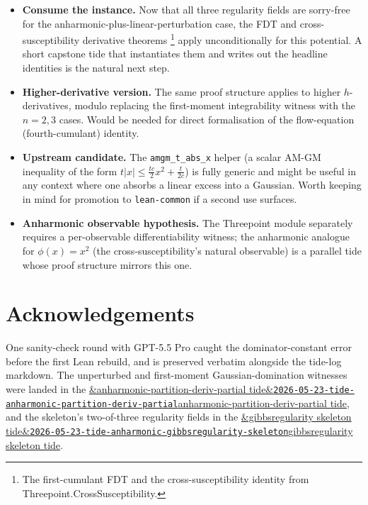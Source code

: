 \documentclass[11pt]{article}
\newcommand{\tideref}[2][]{\href{https://therisensea.org/tides/#2/}{\ifx&#1&\texttt{#2}\else#1\fi}}
\begin{document}
\begin{itemize}[itemsep=2pt]
  \item \textbf{Consume the instance.} Now that all three
    regularity fields are sorry-free for the
    anharmonic-plus-linear-perturbation case, the FDT and
    cross-susceptibility derivative theorems%
    \footnote{The first-cumulant FDT and the cross-susceptibility
    identity from \textsf{Threepoint.CrossSusceptibility}.}
    apply unconditionally for this potential. A short capstone
    tide that instantiates them and writes out the headline
    identities is the natural next step.

  \item \textbf{Higher-derivative version.} The same proof
    structure applies to higher \(h\)-derivatives, modulo replacing
    the first-moment integrability witness with the \(n=2, 3\) cases.
    Would be needed for direct formalisation of the flow-equation
    (fourth-cumulant) identity.

  \item \textbf{Upstream candidate.} The
    \texttt{amgm\_t\_abs\_x} helper (a scalar AM-GM inequality of
    the form \(t |x| \le \tfrac{tc}{2} x^2 + \tfrac{t}{2c}\)) is
    fully generic and might be useful in any context where one
    absorbs a linear excess into a Gaussian. Worth keeping in mind
    for promotion to \texttt{lean-common} if a second use surfaces.

  \item \textbf{Anharmonic observable hypothesis.} The
    \textsf{Threepoint} module separately requires a per-observable
    differentiability witness; the anharmonic analogue for
    \(\phi(x) = x^2\) (the cross-susceptibility's natural observable)
    is a parallel tide whose proof structure mirrors this one.
\end{itemize}

\section*{Acknowledgements}

One sanity-check round with GPT-5.5 Pro caught the dominator-constant
error before the first Lean rebuild, and is preserved verbatim
alongside the tide-log markdown. The unperturbed and first-moment
Gaussian-domination witnesses were landed in the
\tideref[anharmonic-partition-deriv-partial tide]{2026-05-23-tide-anharmonic-partition-deriv-partial},
and the skeleton's two-of-three regularity fields in the
\tideref[gibbsregularity skeleton tide]{2026-05-23-tide-anharmonic-gibbsregularity-skeleton}.
\end{document}
